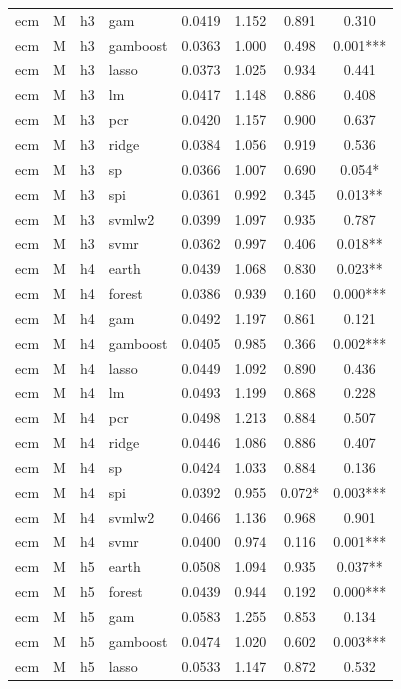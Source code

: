 \begin{ThreePartTable}
\begin{longtable}[t]{llclcccc}
ecm & M & h3 & gam & 0.0419 & 1.152 & 0.891 & 0.310\\
ecm & M & h3 & gamboost & 0.0363 & 1.000 & 0.498 & 0.001***\\
ecm & M & h3 & lasso & 0.0373 & 1.025 & 0.934 & 0.441\\
ecm & M & h3 & lm & 0.0417 & 1.148 & 0.886 & 0.408\\
ecm & M & h3 & pcr & 0.0420 & 1.157 & 0.900 & 0.637\\
ecm & M & h3 & ridge & 0.0384 & 1.056 & 0.919 & 0.536\\
ecm & M & h3 & sp & 0.0366 & 1.007 & 0.690 & 0.054*\\
ecm & M & h3 & spi & 0.0361 & 0.992 & 0.345 & 0.013**\\
ecm & M & h3 & svmlw2 & 0.0399 & 1.097 & 0.935 & 0.787\\
ecm & M & h3 & svmr & 0.0362 & 0.997 & 0.406 & 0.018**\\
\addlinespace
ecm & M & h4 & earth & 0.0439 & 1.068 & 0.830 & 0.023**\\
ecm & M & h4 & forest & 0.0386 & 0.939 & 0.160 & 0.000***\\
ecm & M & h4 & gam & 0.0492 & 1.197 & 0.861 & 0.121\\
ecm & M & h4 & gamboost & 0.0405 & 0.985 & 0.366 & 0.002***\\
ecm & M & h4 & lasso & 0.0449 & 1.092 & 0.890 & 0.436\\
ecm & M & h4 & lm & 0.0493 & 1.199 & 0.868 & 0.228\\
ecm & M & h4 & pcr & 0.0498 & 1.213 & 0.884 & 0.507\\
ecm & M & h4 & ridge & 0.0446 & 1.086 & 0.886 & 0.407\\
ecm & M & h4 & sp & 0.0424 & 1.033 & 0.884 & 0.136\\
ecm & M & h4 & spi & 0.0392 & 0.955 & 0.072* & 0.003***\\
ecm & M & h4 & svmlw2 & 0.0466 & 1.136 & 0.968 & 0.901\\
ecm & M & h4 & svmr & 0.0400 & 0.974 & 0.116 & 0.001***\\
\addlinespace
ecm & M & h5 & earth & 0.0508 & 1.094 & 0.935 & 0.037**\\
ecm & M & h5 & forest & 0.0439 & 0.944 & 0.192 & 0.000***\\
ecm & M & h5 & gam & 0.0583 & 1.255 & 0.853 & 0.134\\
ecm & M & h5 & gamboost & 0.0474 & 1.020 & 0.602 & 0.003***\\
ecm & M & h5 & lasso & 0.0533 & 1.147 & 0.872 & 0.532\\

\end{longtable}
\end{ThreePartTable}
